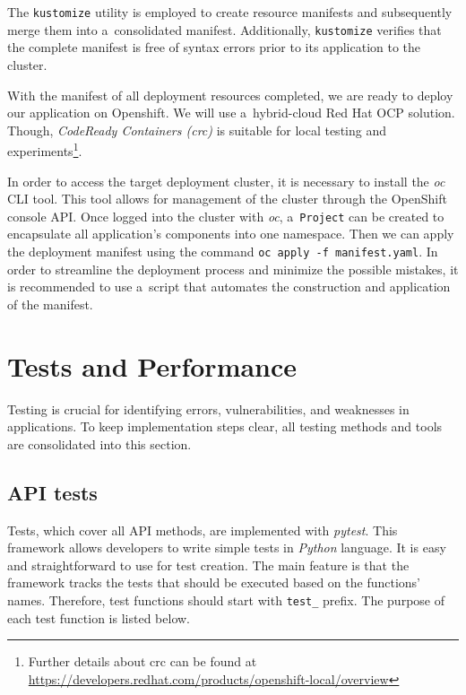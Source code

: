 The \texttt{kustomize} utility is employed to create resource manifests and subsequently merge them into a~consolidated manifest. Additionally, \texttt{kustomize} verifies that the complete manifest is free of syntax errors prior to its application to the cluster. 

With the manifest of all deployment resources completed, we are ready to deploy our application on Openshift. We will use a~hybrid-cloud Red Hat OCP solution. Though, \textit{CodeReady Containers (crc)} is suitable for local testing and experiments\footnote{Further details about crc can be found at \url{https://developers.redhat.com/products/openshift-local/overview}}.

In order to access the target deployment cluster, it is necessary to install the \textit{oc} CLI tool. This tool allows for management of the cluster through the OpenShift console API. Once logged into the cluster with \textit{oc}, a~\texttt{Project} can be created to encapsulate all application's components into one namespace. Then we can apply the deployment manifest using the command \texttt{oc apply -f manifest.yaml}. In order to streamline the deployment process and minimize the possible mistakes, it is recommended to use a~script that automates the construction and application of the manifest.

\section{Tests and Performance}
\label{sec:testing}

Testing is crucial for identifying errors, vulnerabilities, and weaknesses in applications. To keep implementation steps clear, all testing methods and tools are consolidated into this section.

\subsection*{API tests}

Tests, which cover all API methods, are implemented with \textit{pytest}. This framework allows developers to write simple tests in \textit{Python} language. It is easy and straightforward to use for test creation. The main feature is that the framework tracks the tests that should be executed based on the functions' names. Therefore, test functions should start with \texttt{test\_} prefix. The purpose of  each test function is listed below.

